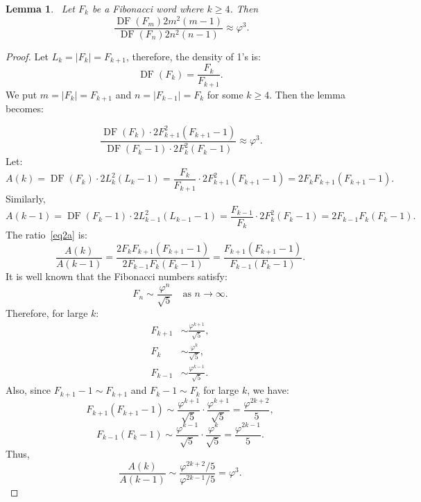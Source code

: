 \documentclass[11pt, a4paper]{article}
\newcommand{\DF}{\operatorname{DF}}
\newtheorem{lemma}[theorem]{Lemma}
\theoremstyle{definition}
\begin{document}
\begin{lemma}~\label{advlemn1}
Let $F_k$ be a Fibonacci word where $k \geqslant 4$. Then
\begin{equation}~\label{eq1advlemn1}
\frac{\DF(F_m) 2 m^2 (m - 1)}{\DF(F_n) 2 n^2 (n - 1)} \approx \varphi^3.
\end{equation}
\end{lemma}

\begin{proof}
Let \( L_k = |F_k| = F_{k+1} \), therefore, the density of 1's is:
\[
\DF(F_k)  = \frac{F_k}{F_{k+1}}.
\]
We put \( m = |F_k| = F_{k+1} \) and \( n = |F_{k-1}| = F_k \) for some \( k \geq 4 \). Then the lemma becomes:

\begin{equation}~\label{eq2a}
\frac{\DF(F_k) \cdot 2F_{k+1}^2(F_{k+1} - 1)}{\DF(F_k-1) \cdot 2F_k^2(F_k - 1)} \approx \varphi^3.
\end{equation}
Let:
\[
A(k) = \DF(F_k) \cdot 2L_k^2(L_k - 1) = \frac{F_k}{F_{k+1}} \cdot 2F_{k+1}^2(F_{k+1} - 1) = 2F_k F_{k+1}(F_{k+1} - 1).
\]
Similarly,
\[
A(k-1) = \DF(F_k-1) \cdot 2L_{k-1}^2(L_{k-1} - 1) = \frac{F_{k-1}}{F_k} \cdot 2F_k^2(F_k - 1) = 2F_{k-1} F_k (F_k - 1).
\]
The ratio~\eqref{eq2a} is:
\[
\frac{A(k)}{A(k-1)} = \frac{2F_k F_{k+1}(F_{k+1} - 1)}{2F_{k-1} F_k (F_k - 1)} = \frac{F_{k+1}(F_{k+1} - 1)}{F_{k-1}(F_k - 1)}.
\]
It is well known that the Fibonacci numbers satisfy:
\[
F_n \sim \frac{\varphi^n}{\sqrt{5}} \quad \text{as } n \to \infty.
\]
Therefore, for large \( k \):
\begin{align*}
F_{k+1} &\sim \frac{\varphi^{k+1}}{\sqrt{5}}, \\
F_k &\sim \frac{\varphi^k}{\sqrt{5}}, \\
F_{k-1} &\sim \frac{\varphi^{k-1}}{\sqrt{5}}.
\end{align*}
Also, since \( F_{k+1} - 1 \sim F_{k+1} \) and \( F_k - 1 \sim F_k \) for large \( k \), we have:
\[
F_{k+1}(F_{k+1} - 1) \sim \frac{\varphi^{k+1}}{\sqrt{5}} \cdot \frac{\varphi^{k+1}}{\sqrt{5}} = \frac{\varphi^{2k+2}}{5},
\]
\[
F_{k-1}(F_k - 1) \sim \frac{\varphi^{k-1}}{\sqrt{5}} \cdot \frac{\varphi^k}{\sqrt{5}} = \frac{\varphi^{2k-1}}{5}.
\]
Thus,
\[
\frac{A(k)}{A(k-1)} \sim \frac{\varphi^{2k+2}/5}{\varphi^{2k-1}/5} = \varphi^3.
\]
\end{proof}
\end{document}
